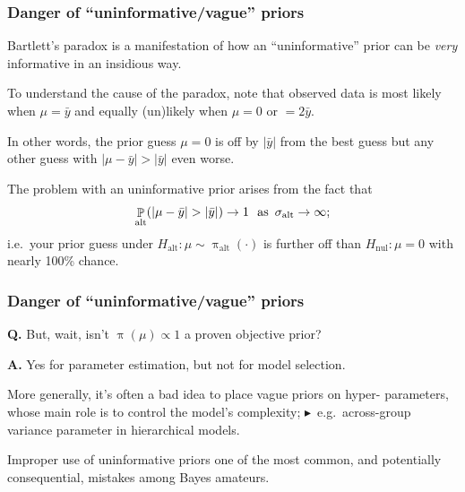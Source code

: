 \documentclass[18pt]{beamer}
\newcommand{\defineTightSpacing}{%
	\setlength{\abovedisplayskip}{.25\baselineskip}%
	\setlength{\belowdisplayskip}{.25\baselineskip}%
}
\newcommand{\noteBullet}{\hspace*{.75em}\textcolor{themecolor}{$\blacktriangleright$}\ }
\newcommand{\thinnerspace}{\mskip.5\thinmuskip}
\DeclareMathOperator{\probability}{\mathbb{P}}
\newcommand{\normalDist}{\operatorname{\mathcal{N}}}
\newcommand{\density}{\operatorname{\pi}}
\newcommand{\hypothesis}{H}
\newcommand{\nullSub}{\mathrm{nul}}
\newcommand{\altSub}{\mathrm{alt}}
\begin{document}
\begin{frame}
\frametitle{Danger of ``uninformative/vague'' priors}
Bartlett's paradox is a manifestation of how an ``uninformative'' prior can be \textit{very} informative in an insidious way.

\pause
\smallskip
To understand the cause of the paradox, note that observed data is most likely when $\mu = \bar{y}$ and equally (un)likely when $\mu = 0$ or $= 2 \bar{y}$.

\pause
\smallskip
In other words, the prior guess $\mu = 0$ is off by $| \bar{y} |$ from the best guess but any other guess with $\left| \mu - \bar{y} \right| > \left| \bar{y} \right|$ even worse.

\pause
\smallskip
The problem with an uninformative prior arises from the fact that
\begin{equation*} \defineTightSpacing%
\probability_\altSub \!\left( \left| \mu - \bar{y} \right| > \left| \bar{y} \right| \right)
	\to 1 \ \text{ as } \, \sigma_\altSub \to \infty;
\end{equation*}
i.e.\ your prior guess under $\hypothesis_\altSub: \mu \sim \density_\altSub(\cdot)$ is further off than $\hypothesis_\nullSub: \mu = 0$ with nearly 100\% chance.
\end{frame}


\begin{frame}
\frametitle{Danger of ``uninformative/vague'' priors}
\textbf{Q.} But, wait, isn't $\density(\mu) \propto 1$ a proven objective prior? 

\pause
\textbf{A.} Yes for parameter estimation, but not for model selection.

\pause
\smallskip
More generally, it's often a bad idea to place vague priors on hyper- parameters, whose main role is to control the model's complexity; 
\pause
\noteBullet e.g.\ across-group variance parameter in hierarchical models. 

\pause
\smallskip
Improper use of uninformative priors one of the most common, and potentially consequential, mistakes among Bayes amateurs.
\end{frame}
\end{document}
